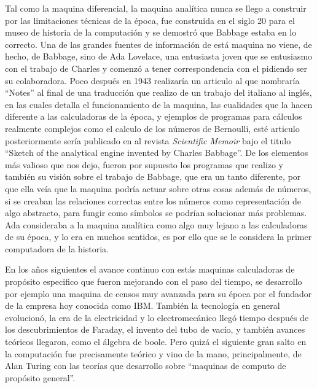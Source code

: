 \documentclass[letterpaper,12pt,oneside]{book}
\begin{document}
		Tal como la maquina diferencial, la maquina analítica nunca se llego a construir por las limitaciones técnicas de la época, fue construida en el siglo
		20 para el museo de historia de la computación y se demostró que Babbage estaba en lo correcto. Una de las grandes fuentes de información de está maquina
		no viene, de hecho, de Babbage, sino de Ada Lovelace, una entusiasta joven que se entusiasmo con el trabajo de Charles y comenzó a tener correspondencia
		con el pidiendo ser su colaboradora. Poco después en 1943 realizaría un articulo al que nombraría ``Notes'' al final de una traducción que realizo de un trabajo
		del italiano al inglés, en las cuales detalla el funcionamiento de la maquina, las cualidades que la hacen diferente a las calculadoras de la época, y
		ejemplos de programas para cálculos realmente complejos como el calculo de los números de Bernoulli, esté articulo posteriormente sería publicado
		en al revista \textit{Scientific Memoir} bajo el titulo ``Sketch of the analytical engine invented by Charles Babbage''. De los elementos más valioso que nos dejo,
		fueron por supuesto los programas que realizo y también su visión sobre el trabajo de Babbage, que era un tanto diferente, por que ella veía que
		la maquina podría actuar sobre otras cosas además de números, si se creaban las relaciones correctas entre los números  como representación de algo abstracto,
		para fungir como símbolos se podrían solucionar más problemas. Ada consideraba a la maquina analítica como algo muy lejano a las calculadoras de su época,
		y lo era en muchos sentidos, es por ello que se le considera la primer computadora de la historia.
		
		En los años siguientes el avance continuo con estás maquinas calculadoras de propósito especifico que fueron mejorando con el paso del tiempo, se desarrollo
		por ejemplo una maquina de censos muy avanzada para su época por el fundador de la empresa hoy conocida como IBM. También la tecnología en general evolucionó,
		la era de la electricidad y lo electromecánico llegó tiempo después de los descubrimientos de Faraday, el invento del tubo de vacío, y también
		avances teóricos llegaron, como el álgebra de boole. Pero quizá el siguiente gran salto en la computación fue precisamente
		teórico y vino de la mano, principalmente, de Alan Turing con las teorías que desarrollo sobre ``maquinas de computo de propósito general''.
		
\end{document}
